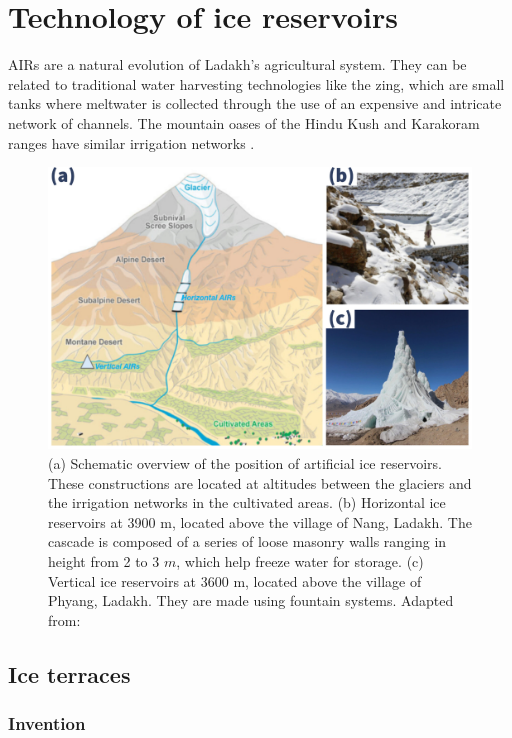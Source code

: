 \chapter{Technology of ice reservoirs}

AIRs are a natural evolution of Ladakh's agricultural system. They can be related to traditional water
harvesting technologies like the zing, which are small tanks where meltwater is collected through the use of an
expensive and intricate network of channels. The mountain oases of the Hindu Kush and Karakoram ranges have
similar irrigation networks \citep{nusserLocalKnowledgeGlobal2016}.

\begin{figure}[t]
\centering
\includegraphics[width=12cm]{Figures/AIR_forms.jpg}

\caption{(a) Schematic overview of the position of artificial ice reservoirs. These constructions are located at
  altitudes between the glaciers and the irrigation networks in the cultivated areas. (b) Horizontal ice
  reservoirs at 3900 m, located above the village of Nang, Ladakh. The cascade is composed of a series of loose
  masonry walls ranging in height from 2 to 3 $m$, which help freeze water for storage. (c) Vertical ice
reservoirs at 3600 m, located above the village of Phyang, Ladakh. They are made using fountain systems. Adapted
from: \cite{nusserLocalKnowledgeGlobal2016}}

\label{fig:AIRforms}
\end{figure}

\section{Ice terraces}

\subsection{Invention}

